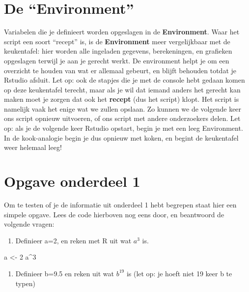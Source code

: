 \documentclass[
  a4paper,
]{scrbook}
\newenvironment{Shaded}{\begin{snugshade}}{\end{snugshade}}
\newcommand{\DecValTok}[1]{\textcolor[rgb]{0.68,0.00,0.00}{#1}}
\newcommand{\NormalTok}[1]{\textcolor[rgb]{0.00,0.23,0.31}{#1}}
\newcommand{\OtherTok}[1]{\textcolor[rgb]{0.00,0.23,0.31}{#1}}
\newcommand{\SpecialCharTok}[1]{\textcolor[rgb]{0.37,0.37,0.37}{#1}}
\providecommand{\tightlist}{%
  \setlength{\itemsep}{0pt}\setlength{\parskip}{0pt}}\usepackage{longtable,booktabs,array}
\theoremstyle{definition}
\theoremstyle{remark}
\begin{document}
\hypertarget{de-environment}{%
\section{De ``Environment''}\label{de-environment}}

Variabelen die je definieert worden opgeslagen in de
\textbf{Environment}. Waar het script een soort ``recept'' is, is de
\textbf{Environment} meer vergelijkbaar met de keukentafel: hier worden
alle ingeladen gegevens, berekeningen, en grafieken opgeslagen terwijl
je aan je gerecht werkt. De environment helpt je om een overzicht te
houden van wat er allemaal gebeurt, en blijft behouden totdat je Rstudio
afsluit. Let op: ook de stapjes die je met de console hebt gedaan komen
op deze keukentafel terecht, maar als je wil dat iemand anders het
gerecht kan maken moet je zorgen dat ook het \textbf{recept} (dus het
script) klopt. Het script is namelijk vaak het enige wat we zullen
opslaan. Zo kunnen we de volgende keer ons script opnieuw uitvoeren, of
ons script met andere onderzoekers delen. Let op: als je de volgende
keer Rstudio opstart, begin je met een leeg Environment. In de
kook-analogie begin je dus opnieuw met koken, en begint de keukentafel
weer helemaal leeg!

\hypertarget{opgave-onderdeel-1}{%
\section{Opgave onderdeel 1}\label{opgave-onderdeel-1}}

Om te testen of je de informatie uit onderdeel 1 hebt begrepen staat
hier een simpele opgave. Lees de code hierboven nog eens door, en
beantwoord de volgende vragen:

\begin{enumerate}
\def\labelenumi{\arabic{enumi}.}
\tightlist
\item
  Definieer a=2, en reken met R uit wat \(a^3\) is.
\end{enumerate}

\begin{Shaded}
\begin{Highlighting}[]
\NormalTok{a }\OtherTok{\textless{}{-}} \DecValTok{2}
\NormalTok{a}\SpecialCharTok{\^{}}\DecValTok{3}
\end{Highlighting}
\end{Shaded}

\begin{enumerate}
\def\labelenumi{\arabic{enumi}.}
\setcounter{enumi}{1}
\tightlist
\item
  Definieer b=9.5 en reken uit wat \(b^{19}\) is (let op: je hoeft niet
  19 keer b te typen)
\end{enumerate}
\end{document}
